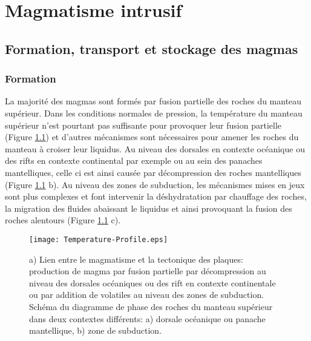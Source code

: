 \chapter{Magmatisme intrusif}
\label{chap1}
\minitoc

\section{Formation, transport et stockage des magmas}
\label{sec:magm-intr-un}

\subsection{Formation}
\label{sec:formation-1}

La majorité des magmas sont formés  par fusion partielle des roches du
manteau  supérieur.   Dans les  conditions  normales  de pression,  la
température du  manteau supérieur  n'est pourtant pas  suffisante pour
provoquer leur fusion partielle  (Figure \ref{Geoterme}) et d'autres
mécanismes  sont  nécessaires pour  amener  les  roches du  manteau  à
croiser leur liquidus.   Au niveau des dorsales  en contexte océanique
ou  des rifts  en  contexte continental  par exemple  ou  au sein  des
panaches mantelliques, celle ci est ainsi causée par décompression des
roches mantelliques (Figure \ref{Geoterme} b).  Au niveau des zones de subduction, les
mécanismes mises  en jeux  sont plus complexes  et font  intervenir la
déshydratation  par chauffage  des  roches, la  migration des  fluides
abaissant  le  liquidus  et  ainsi provoquant  la  fusion  des  roches
alentours (Figure \ref{Geoterme} c).

\begin{figure}[htpb]
  \begin{center}
    \graphicspath{ {/Users/thorey/Documents/These/Manuscript/Figure/Chapter1/} }
    \texttt{[image: Temperature-Profile.eps]}
    \caption{a) Lien entre le magmatisme et la tectonique des plaques:
      production de  magma par  fusion partielle par  décompression au
      niveau  des   dorsales  océaniques  ou  des   rift  en  contexte
      continentale ou par addition de volatiles au niveau des zones de
      subduction. Schéma du  diagramme de phase des  roches du manteau
      supérieur dans  deux contextes différents: a)  dorsale océanique
      ou panache mantellique, b) zone de subduction.}
    \label{Geoterme}
  \end{center}
\end{figure}

